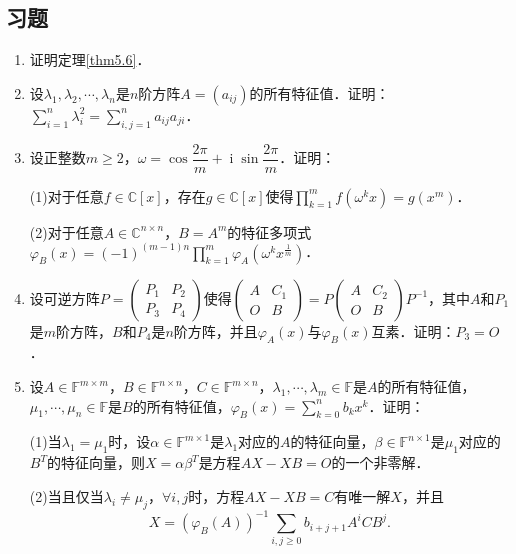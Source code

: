 \documentclass[a4paper,fontset=windows]{ctexbook}
\theoremstyle{definition}
\DeclareMathOperator{\I}{i}
\renewcommand{\ge}{\geqslant}
\begin{document}
\subsection*{习题}

\begin{enumerate}
\item 证明定理\ref{thm5.6}．

\item 设$\lambda_1,\lambda_2,\cdots,\lambda_n$是$n$阶方阵$A=(a_{ij})$的所有特征值．证明：$\sum\limits_{i=1}^n\lambda_i^2=\sum\limits_{i,j=1}^na_{ij}a_{ji}$．

\item 设正整数$m\ge 2$，$\omega=\cos\dfrac{2\pi}{m}+\I\sin\dfrac{2\pi}{m}$．证明：

(1)对于任意$f\in\mathbb{C}[x]$，存在$g\in\mathbb{C}[x]$使得$\prod\limits_{k=1}^mf(\omega^kx)=g(x^m)$．

(2)对于任意$A\in\mathbb{C}^{n\times n}$，$B=A^m$的特征多项式$\varphi_B(x)=(-1)^{(m-1)n}\prod\limits_{k=1}^m\varphi_A(\omega^kx^{\frac{1}{m}})$．

\item 设可逆方阵$P=\begin{pmatrix}P_1&P_2 \\ P_3&P_4\end{pmatrix}$使得$\begin{pmatrix}A&C_1 \\ O&B\end{pmatrix}=P\begin{pmatrix}A&C_2 \\ O&B\end{pmatrix}P^{-1}$，其中$A$和$P_1$是$m$阶方阵，$B$和$P_4$是$n$阶方阵，并且$\varphi_A(x)$与$\varphi_B(x)$互素．证明：$P_3=O$．

\item 设$A\in\mathbb{F}^{m\times m}$，$B\in\mathbb{F}^{n\times n}$，$C\in\mathbb{F}^{m\times n}$，$\lambda_1,\cdots,\lambda_m\in\mathbb{F}$是$A$的所有特征值，$\mu_1,\cdots,\mu_n\in\mathbb{F}$是$B$的所有特征值，$\varphi_B(x)=\sum\limits_{k=0}^nb_kx^k$．证明：

(1)当$\lambda_1=\mu_1$时，设$\alpha\in\mathbb{F}^{m\times 1}$是$\lambda_1$对应的$A$的特征向量，$\beta\in\mathbb{F}^{n\times 1}$是$\mu_1$对应的$B^T$的特征向量，则$X=\alpha\beta^T$是方程$AX-XB=O$的一个非零解．

(2)当且仅当$\lambda_i\ne\mu_j$，$\forall i,j$时，方程$AX-XB=C$有唯一解$X$，并且
$$X=(\varphi_B(A))^{-1}\sum\limits_{i,j\ge 0}b_{i+j+1}A^iCB^j.$$


\end{enumerate}
\end{document}
